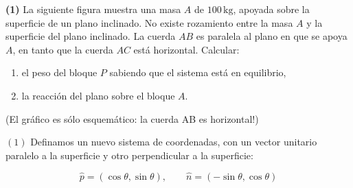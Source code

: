 \documentclass[12pt]{article}
\theoremstyle{definition}
\begin{document}
\begin{shaded}
    \textbf{(1)} La siguiente figura muestra una masa $A$ de $100 \,\text{kg}$, apoyada sobre la superficie de un plano inclinado. 
No existe rozamiento entre la masa $A$ y la superficie del plano inclinado. 
La cuerda $AB$ es paralela al plano en que se apoya $A$, en tanto que la cuerda $AC$ está horizontal. 
Calcular:
\begin{enumerate}
  \item el peso del bloque $P$ sabiendo que el sistema está en equilibrio,
  \item la reacción del plano sobre el bloque $A$.
\end{enumerate}

\begin{center}
\end{center}

(El gráfico es sólo esquemático: la cuerda AB es horizontal!)
\end{shaded}

$(1)$ Definamos un nuevo sistema de coordenadas, con un vector unitario paralelo
a la superficie y otro perpendicular a la superficie: 

\begin{equation*}
    \hat{p} = (\cos \theta, \sin \theta), \qquad \hat{n} = (-\sin \theta, \cos
    \theta)
\end{equation*}
\end{document}
